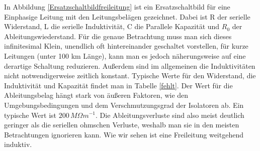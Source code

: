 In Abbildung \ref{Ersatzschaltbildfreileitung} ist ein Ersatzschaltbild für eine Einphasige Leitung mit den Leitungsbelägen gezeichnet.
Dabei ist R der serielle Widerstand, L die serielle Induktivität, C die Parallele Kapazität und $R_0$ der Ableitungswiederstand. Für die genaue Betrachtung muss man sich dieses infinitesimal Klein, unendlich oft hintereinander geschaltet vorstellen, für kurze Leitungen (unter 100 km Länge), kann man es jedoch näherungsweise auf eine derartige Schaltung reduzieren. Außerdem sind im allgemeinen die Induktivitäten nicht notwendigerweise zeitlich konstant.\cite{Flosdorff}
Typische Werte für den Widerstand, die Induktivität und Kapazität findet man in Tabelle \ref{fehlt}. Der Wert für die Ableitungsbelag hängt stark von äußeren Faktoren, wie den Umgebungsbedingungen und dem Verschmutzungsgrad der Isolatoren ab. Ein typische Wert ist $200\,M\Omega m^{-1}$.\cite{Harrison} Die Ableitungsverluste sind also meist deutlich geringer als die seriellen ohmschen Verluste, weshalb man sie in den meisten Betrachtungen ignorieren kann. Wie wir sehen ist eine Freileitung weitgehend induktiv.

